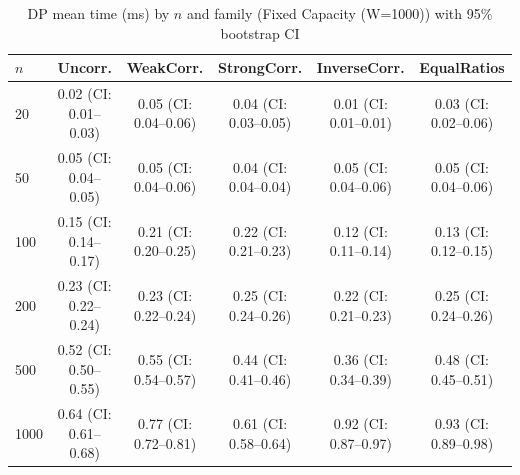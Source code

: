 \begin{table}[tb]
\centering
\caption{DP mean time (ms) by $n$ and family (Fixed Capacity (W=1000)) with 95\% bootstrap CI}
\label{tab:fixed-dp-scaling}
\begin{tabular}{lccccc}
\toprule
$n$ & Uncorr. & WeakCorr. & StrongCorr. & InverseCorr. & EqualRatios \\
\midrule
20 & 0.02 (CI: 0.01–0.03) & 0.05 (CI: 0.04–0.06) & 0.04 (CI: 0.03–0.05) & 0.01 (CI: 0.01–0.01) & 0.03 (CI: 0.02–0.06) \\
50 & 0.05 (CI: 0.04–0.05) & 0.05 (CI: 0.04–0.06) & 0.04 (CI: 0.04–0.04) & 0.05 (CI: 0.04–0.06) & 0.05 (CI: 0.04–0.06) \\
100 & 0.15 (CI: 0.14–0.17) & 0.21 (CI: 0.20–0.25) & 0.22 (CI: 0.21–0.23) & 0.12 (CI: 0.11–0.14) & 0.13 (CI: 0.12–0.15) \\
200 & 0.23 (CI: 0.22–0.24) & 0.23 (CI: 0.22–0.24) & 0.25 (CI: 0.24–0.26) & 0.22 (CI: 0.21–0.23) & 0.25 (CI: 0.24–0.26) \\
500 & 0.52 (CI: 0.50–0.55) & 0.55 (CI: 0.54–0.57) & 0.44 (CI: 0.41–0.46) & 0.36 (CI: 0.34–0.39) & 0.48 (CI: 0.45–0.51) \\
1000 & 0.64 (CI: 0.61–0.68) & 0.77 (CI: 0.72–0.81) & 0.61 (CI: 0.58–0.64) & 0.92 (CI: 0.87–0.97) & 0.93 (CI: 0.89–0.98) \\
\bottomrule
\end{tabular}
\end{table}

